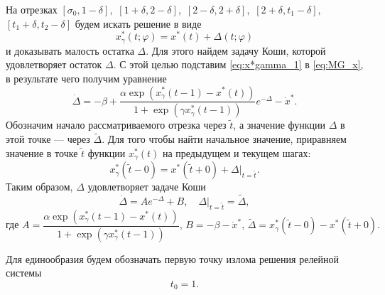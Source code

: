 На отрезках 
$[\sigma_0, 1 - \delta],$ 
$[1 + \delta, 2 - \delta],$ 
$[2 - \delta, 2 + \delta],$ 
$[2 + \delta, t_1 - \delta],$ 
$[t_1 + \delta, t_2 - \delta]$ 
будем искать решение в виде
%
\begin{equation}
    \label{eq:x*gamma_1}
    x^*_\gamma(t; \varphi) = x^*(t) + \Delta(t; \varphi)
\end{equation}
%
и доказывать малость остатка $\Delta$. Для этого найдем задачу Коши, которой удовлетворяет остаток $\Delta$. С этой целью подставим \eqref{eq:x*gamma_1} в \eqref{eq:MG_x}, в результате чего получим уравнение
%
\begin{equation*}
    \dot{\Delta} = -\beta + \frac{\alpha\exp(x_{\gamma}^*(t - 1) - x^*(t))}{1 + \exp(\gamma x_{\gamma}^*(t - 1))}e^{-\Delta}-\dot{x}^*.
\end{equation*}
%
Обозначим начало рассматриваемого отрезка через $\tilde{t}$, а значение функции $\Delta$ в этой точке --- через $\tilde{\Delta}$. Для того чтобы найти начальное значение, приравняем значение в точке $\tilde{t}$ функции $x_{\gamma}^*(t)$ на предыдущем и текущем шагах:
%
\[x_{\gamma}^*(\tilde{t} - 0) = x^*(\tilde{t} + 0)+\Delta|_{t=\tilde{t}}.\]
%
Таким образом, $\Delta$ удовлетворяет задаче Коши
\begin{equation}
        \label{eq:task_DeltaAB}
        \dot{\Delta}=A e^{-\Delta} + B,\quad \Delta|_{t=\tilde{t}}=\tilde{\Delta},
\end{equation}
%
\begin{equation}
    \label{AB_eq:x*gamma_1}
\text{где } A = \frac{\alpha\exp(x_{\gamma}^*(t - 1) - x^*(t))}{1+\exp(\gamma x_{\gamma}^*(t - 1))},\, 
B = -\beta-\dot{x}^*,\, 
\tilde{\Delta}=x_{\gamma}^*(\tilde{t} - 0) - x^*(\tilde{t} + 0).
\end{equation}

Для единообразия будем обозначать первую точку излома решения релейной системы
\begin{equation}
	\label{eq:t0:ch1}
	t_0 = 1.
\end{equation}

